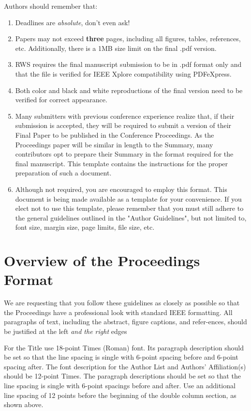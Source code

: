 \documentclass[10pt,conference,letterpaper]{RWWTemplate}
\begin{document}
Authors should remember that:
\begin{enumerate}
\item Deadlines are {\it absolute}, don't even ask!
\item Papers may not exceed {\bf three} pages, including all figures, tables, references, etc. Additionally, there is a 1MB size limit on the final .pdf version.

\item RWS requires the final manuscript submission to be in .pdf format only and that the file is verified for IEEE Xplore compatibility using PDFeXpress.

\item Both color and black and white reproductions of the final version need to be verified for correct appearance.

\item Many submitters with previous conference experience realize that, if their submission is accepted, they will be required to submit a version of their Final Paper to be published in the Conference Proceedings. As the Proceedings paper will be similar in length to the Summary, many contributors opt to prepare their Summary in the format required for the final manuscript. This template contains the instructions for the proper preparation of such a document.\label{item5}

\item Although not required, you are encouraged to employ this format. This document is being made available as a template for your convenience. If you elect not to use this template, please remember that you must still adhere to the general guidelines outlined in the "Author Guidelines", but not limited to, font size, margin size, page limits, file size, etc.
\end{enumerate}
\section{Overview of the Proceedings Format}
We are requesting that you follow these guidelines as closely as possible so that the Proceedings have a professional look with standard IEEE formatting. All paragraphs of text, including the abstract, figure captions, and refer-ences, should be justified at the left {\it and the right} edges

For the Title use 18-point Times (Roman) font. Its paragraph description should be set so that the line spacing is single with 6-point spacing before and 6-point spacing after. The font description for the Author List and Authors' Affiliation(s) should be 12-point Times. The paragraph descriptions should be set so that the line spacing is single with 6-point spacings before and after. Use an additional line spacing of 12 points before the beginning of the double column section, as shown above.
\end{document}
